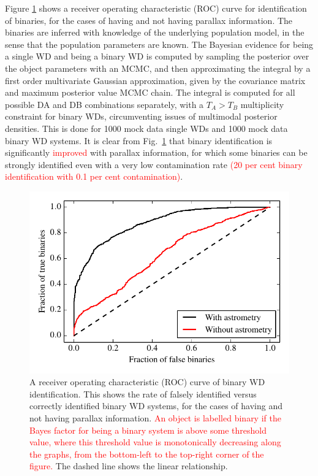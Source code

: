 \documentclass[fleqn,usenatbib]{mnras}
\newcommand{\changes}[1]{\textcolor{red}{#1}}
\newcommand{\Teff}{T}
\begin{document}
Figure \ref{fig:ROC_binaries} shows a receiver operating characteristic (ROC) curve for identification of binaries, for the cases of having and not having parallax information. The binaries are inferred with knowledge of the underlying population model, in the sense that the population parameters are known. The Bayesian evidence for being a single WD and being a binary WD is computed by sampling the posterior over the object parameters with an MCMC, and then approximating the integral by a first order multivariate Gaussian approximation, given by the covariance matrix and maximum posterior value MCMC chain. The integral is computed for all possible DA and DB combinations separately, with a $\Teff_A>\Teff_B$ multiplicity constraint for binary WDs, circumventing issues of multimodal posterior densities. This is done for 1000 mock data single WDs and 1000 mock data binary WD systems. It is clear from Fig.~\ref{fig:ROC_binaries} that binary identification is significantly \changes{improved} with parallax information, for which some binaries can be strongly identified even with a very low contamination rate \changes{(20 per cent binary identification with 0.1 per cent contamination)}.
\begin{figure}
	\includegraphics[width=\columnwidth]{ROC_binaries.pdf}
    \caption{A receiver operating characteristic (ROC) curve of binary WD identification. This shows the rate of falsely identified versus correctly identified binary WD systems, for the cases of having and not having parallax information. \changes{An object is labelled binary if the Bayes factor for being a binary system is above some threshold value, where this threshold value is monotonically decreasing along the graphs, from the bottom-left to the top-right corner of the figure.} The dashed line shows the linear relationship.}
    \label{fig:ROC_binaries}
\end{figure}
\end{document}
